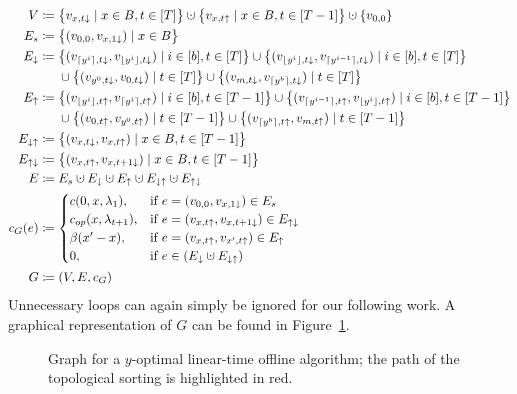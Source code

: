 \begin{align*}
	V&\coloneqq\bigl\{v_{x,t\downarrow}\mid x\in B,t\in[T]\bigr\}\dotcup\bigl\{v_{x,t\uparrow}\mid x\in B, t\in[T-1]\bigr\}\dotcup\{v_{0,0}\}\\
	E_s&\coloneqq\bigl\{(v_{0,0},v_{x,1\downarrow})\mid x\in B\bigr\}\\
	E_\downarrow&\coloneqq\bigl\{(v_{\ceil{y^i},t\downarrow},v_{\floor{y^{i}},t\downarrow})\mid i\in[b],t\in[T]\bigr\}\cup\bigl\{(v_{\floor{y^i},t\downarrow},v_{\ceil{y^{i-1}},t\downarrow})\mid i\in[b],t\in[T]\bigr\}\\
	&\phantom{{}\coloneqq{}}\cup\bigl\{(v_{y^0,t\downarrow},v_{0,t\downarrow})\mid t\in[T]\bigr\}\cup\bigl\{(v_{m,t\downarrow},v_{\ceil{y^b},t\downarrow})\mid t\in[T]\bigr\}\\
	E_\uparrow&\coloneqq\bigl\{(v_{\floor{y^i},t\uparrow},v_{\ceil{y^i},t\uparrow})\mid i\in[b],t\in[T-1]\bigr\}\cup\bigl\{(v_{\ceil{y^{i-1}},t\uparrow},v_{\floor{y^i},t\uparrow})\mid i\in[b],t\in[T-1]\bigr\}\\
	&\phantom{{}\coloneqq{}}\cup\bigl\{(v_{0,t\uparrow},v_{y^0,t\uparrow})\mid t\in[T-1]\bigr\}\cup\bigl\{(v_{\ceil{y^b},t\uparrow},v_{m,t\uparrow})\mid t\in[T-1]\bigr\}\\
	E_{\downarrow\uparrow}&\coloneqq\bigl\{(v_{x,t\downarrow},v_{x,t\uparrow})\mid x\in B,t\in[T-1]\bigr\}\\
	E_{\uparrow\downarrow}&\coloneqq\bigl\{(v_{x,t\uparrow},v_{x,t+1\downarrow})\mid x\in B,t\in[T-1]\bigr\}\\
	E&\coloneqq E_s\dotcup E_\downarrow\dotcup E_\uparrow\dotcup E_{\downarrow\uparrow}\dotcup E_{\uparrow\downarrow}\\
	c_G(e)&\coloneqq
	\begin{cases}
		\costs(0,x,\lambda_1), & \text{if $e=(v_{0,0},v_{x,1\downarrow})\in E_s$}\\
		\opcosts(x,\lambda_{t+1}), & \text{if $e=(v_{x,t\uparrow},v_{x,t+1\downarrow})\in E_{\uparrow\downarrow}$}\\
		\beta(x'-x), & \text{if $e=(v_{x,t\uparrow},v_{x',t\uparrow})\in E_\uparrow$}\\
		0, & \text{if $e\in(E_\downarrow\dotcup E_{\downarrow\uparrow})$}
	\end{cases}\\
	G&\coloneqq(V,E,c_G)
\end{align*}
Unnecessary loops can again simply be ignored for our following work. A graphical representation of $G$ can be found in Figure~\ref{fig:graph_lin_approx_y}.
\begin{figure}[H]

\caption{Graph for a $y$-optimal linear-time offline algorithm; the path of the topological sorting is highlighted in red.}
\label{fig:graph_lin_approx_y}
\end{figure}
